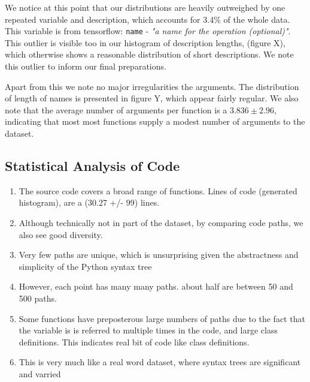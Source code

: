 We notice at this point that our distributions are heavily outweighed by one repeated variable and description, which accounts for 3.4\% of the whole data. This variable is from tensorflow: \texttt{name} - \textit{"a name for the operation (optional)"}. 
This outlier is visible too in our histogram of description lengths, (figure X), which otherwise shows a reasonable distribution of short descriptions. We note this outlier to inform our final preparations.  

Apart from this we note no major irregularities the arguments. The distribution of length of names is presented in figure Y, which appear fairly regular.  We also note that the average number of arguments per function is a $3.836 \pm 2.96$, indicating that most most functions supply a modest number of arguments to the dataset.


\subsection{Statistical Analysis of Code} %
\label{sub:statistical_analysis_of_code}

\begin{enumerate}
    \item The source code covers a broad range of functions. Lines of code (generated histogram), are a (30.27 +/- 99) lines. 
    \item Although technically not in part of the dataset, by comparing code paths, we also see good diversity. 
    \item Very few paths are unique, which is unsurprising given the abstractness and simplicity of the Python syntax tree
    \item However, each point has many many paths.  about half are between 50 and 500 paths.
    \item  Some functions have preposterous large numbers of paths due to the fact that the variable is is referred to multiple times in the code, and large class definitions. This indicates real bit of code like class definitions.
    \item This is very much like a real word dataset, where syntax trees are significant and varried
\end{enumerate}
